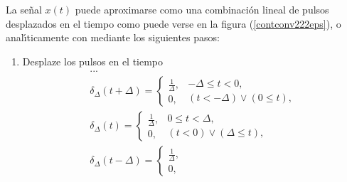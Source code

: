 La se\~{n}al $x(t)$ puede aproximarse como una combinaci\'{o}n lineal
de pulsos desplazados en el tiempo como puede verse en la figura
(\ref{contconv222eps}), o anal\'{\i}ticamente con mediante los
siguientes pasos:
\begin{enumerate}
\item Desplaze los pulsos en el tiempo
\begin{equation}
        \begin{array}{c}
                ...                                             \\ 
                \delta _{\Delta }\left( t+\Delta \right) =
                        \left\{ \begin{array}{l}
                                        \frac{1}{\Delta },      \\ 
                                        0,
                                \end{array}
                                \begin{array}{l}
                                        -\Delta \leq t<0,       \\ 
                                        \left( t<-\Delta \right) \vee \left( 0\leq t\right) ,
                                \end{array}
                        \right.                                 \\ 
                \delta _{\Delta }\left( t\right) =
                        \left\{ \begin{array}{l}
                                        \frac{1}{\Delta },      \\ 
                                        0,
                                \end{array}
                                \begin{array}{l}
                                        0\leq t<\Delta ,        \\ 
                                        \left( t<0\right) \vee \left( \Delta \leq t\right) ,
                                \end{array}
                        \right.                                 \\ 
                \delta _{\Delta }\left( t-\Delta \right) =
                        \left\{ \begin{array}{l}
                                        \frac{1}{\Delta },      \\ 
                                        0,

\end{array}
\end{array}
\end{equation}
\end{enumerate}
